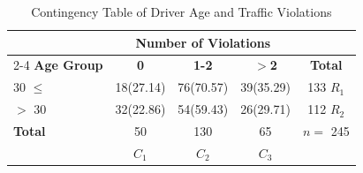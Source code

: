 \begin{table}[H]
\centering
\caption{Contingency Table of Driver Age and Traffic Violations}
\label{tab:table1}
\begin{tabular}{@{}l|ccc|c@{}}
\toprule
 & \multicolumn{3}{c|}{\textbf{Number of Violations}} & \\
\cmidrule{2-4}
\textbf{Age Group} & \textbf{0} & \textbf{1-2} & \textbf{$>$2} & \textbf{Total} \\ 
\midrule
30 $\le$ & 18(27.14) & 76(70.57) & 39(35.29) & 133 $R_{1}$\\
$>$ 30 & 32(22.86) & 54(59.43) & 26(29.71) & 112 $R_{2}$\\
\midrule
\textbf{Total} & 50 & 130 & 65 & $n =$ 245 \\ 
\ & $C_{1}$ & $C_{2}$ & $C_{3}$ &  \\ 
\bottomrule
\end{tabular}
\end{table}